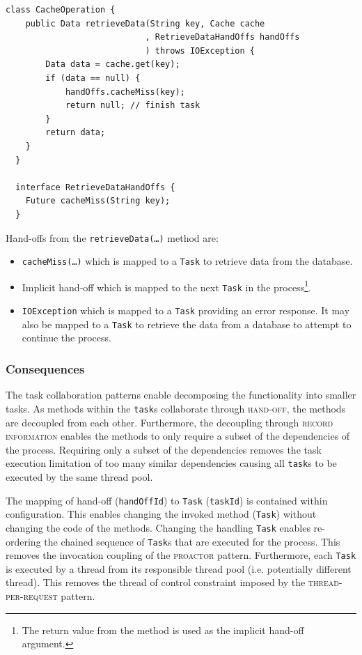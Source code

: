 \documentclass[prodmode]{style/acmlarge}
\begin{document}
\begin{lstlisting}[float,label=lst:Example_Method_Task]
  class CacheOperation {
    public Data retrieveData(String key, Cache cache
                            , RetrieveDataHandOffs handOffs
                            ) throws IOException {
        Data data = cache.get(key);
        if (data == null) {
            handOffs.cacheMiss(key);
            return null; // finish task
        }
        return data;
    }
  }

  interface RetrieveDataHandOffs {
    Future cacheMiss(String key);
  }
\end{lstlisting}

Hand-offs from the \texttt{retrieveData(\ldots)} method are:
\begin{itemize}
  \item \texttt{cacheMiss(\ldots)} which is mapped to a \texttt{Task} to retrieve data from the database.
  \item Implicit hand-off which is mapped to the next \texttt{Task} in the process\footnote{The return value from the method is used as the implicit hand-off argument.}.
  \item \texttt{IOException} which is mapped to a \texttt{Task} providing an error response.  It may also be mapped to a \texttt{Task} to retrieve the data from a database to attempt to continue the process.
\end{itemize}


\subsubsection*{Consequences}

The task collaboration patterns enable decomposing the functionality into
smaller tasks.  As methods within the \texttt{task}s collaborate through
\textsc{hand-off}, the methods are decoupled from each other.  Furthermore, the
decoupling through \textsc{record information} enables the methods to only
require a subset of the dependencies of the process.  Requiring only a subset of
the dependencies removes the task execution limitation of too many similar
dependencies causing all \texttt{task}s to be executed by the same thread pool.

The mapping of hand-off (\texttt{handOffId}) to \texttt{Task} (\texttt{taskId})
is contained within configuration.  This enables changing the invoked method
(\texttt{Task}) without changing the code of the methods.  Changing the handling
\texttt{Task} enables re-ordering the chained sequence of \texttt{Task}s that
are executed for the process.  This removes the invocation coupling of the
\textsc{proactor} pattern.  Furthermore, each \texttt{Task} is executed by a
thread from its responsible thread pool (i.e. potentially different thread). 
This removes the thread of control constraint imposed by the
\textsc{thread-per-request} pattern.
\end{document}
